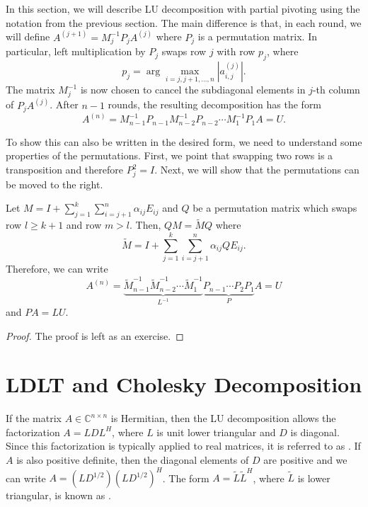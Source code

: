 In this section, we will describe LU decomposition with partial pivoting using the notation from the previous section.
The main difference is that, in each round, we will define $A^{(j+1)} = M_j^{-1} P_j A^{(j)}$ where $P_j$ is a permutation matrix.
In particular, left multiplication by $P_j$ swaps row $j$ with row $p_j$, where
\[ p_j = \arg \max_{i=j,j+1,\ldots,n} | a^{(j)}_{i,j} |. \]
The matrix $M_j^{-1}$ is now chosen to cancel the subdiagonal elements in $j$-th column of $P_j A^{(j)}$.
After $n-1$ rounds, the resulting decomposition has the form
\[ A^{(n)} = M_{n-1}^{-1} P_{n-1} M_{n-2}^{-1} P_{n-2} \cdots M_1^{-1} P_1 A = U. \]

To show this can also be written in the desired form, we need to understand some properties of the permutations.
First, we point that swapping two rows is a transposition and therefore $P_j^2 = I$.
Next, we will show that the permutations can be moved to the right.
\begin{lemma}
Let $M = I + \sum_{j=1}^k \sum_{i=j+1}^n \alpha_{ij} E_{ij}$ and $Q$ be a permutation matrix which swaps row $l \geq k+1$ and row $m>l$.
Then, $Q M = \widetilde{M} Q$ where
\[ \widetilde{M} = I + \sum_{j=1}^k \sum_{i=j+1}^n \alpha_{ij} Q E_{ij}. \]
Therefore, we can write
\[ A^{(n)} = \underbrace{\widetilde{M}_{n-1}^{-1} \widetilde{M}_{n-2}^{-1} \cdots \widetilde{M}_1^{-1}}_{L^{-1}} \underbrace{P_{n-1} \cdots P_2 P_1}_P A = U \]
and $ P A = L U$.
\end{lemma}
\begin{proof}
The proof is left as an exercise.
\end{proof}

\section{LDLT and Cholesky Decomposition}

If the matrix $A \in \mathbb{C}^{n \times n}$ is Hermitian, then the LU decomposition allows the factorization $A = L D L^H$, where $L$ is unit lower triangular and $D$ is diagonal.
Since this factorization is typically applied to real matrices, it is referred to as .
If $A$ is also positive definite, then the diagonal elements of $D$ are positive and we can write $A = \left(L D^{1/2} \right) \left(L D^{1/2}\right)^H$.
The form $A = \widetilde{L} \widetilde{L}^H$, where $\widetilde{L}$ is lower triangular, is known as .

\iffalse
To show such a decomposition exists, we note that standard LU decomposition gives an $L$ such that $L^{-1} A$ is upper triangular.
The same proof, using elementary column operations applied on the right, shows that $A L^{-H}$ is lower triangular.
But, $\left( A L^{-H} \right)^H = L^{-1} A^H = L^{-1} A$.
\fi
 
